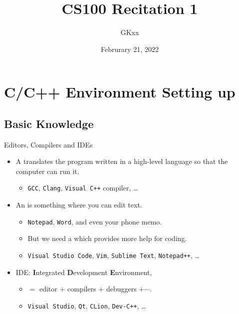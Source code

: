 \documentclass[handout]{beamer}
\title{CS100 Recitation 1}
\author{GKxx}
\date{Februrary 21, 2022}
\begin{document}
\begin{frame}
    \maketitle
\end{frame}


\section{C/C++ Environment Setting up}

\subsection{Basic Knowledge}

\begin{frame}{Editors, Compilers and IDEs}
    \begin{itemize}
        \item A  translates the program written in a high-level language so that the computer can run it.
        \begin{itemize}
            \item \texttt{GCC}, \texttt{Clang}, \texttt{Visual C++} compiler, \dots
        \end{itemize}
        \pause
        \item An  is something where you can edit text.
        \begin{itemize}
            \item \texttt{Notepad}, \texttt{Word}, and even your phone memo.
            \pause
            \item But we need a  which provides more help for coding.
            \item \texttt{Visual Studio Code}, \texttt{Vim}, \texttt{Sublime Text}, \texttt{Notepad++}, \dots
        \end{itemize}
        \pause
        \item IDE: \textbf{I}ntegrated \textbf{D}evelopment \textbf{E}nvironment,
        \begin{itemize}
            \item \(=\) editor \(+\) compilers \(+\) debuggers \(+\cdots\).
            \item \texttt{Visual Studio}, \texttt{Qt}, \texttt{CLion}, \texttt{Dev-C++}, \dots
        \end{itemize}
    \end{itemize}
\end{frame}
\end{document}

